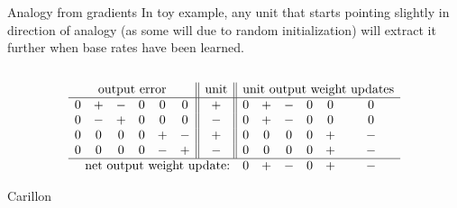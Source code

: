 \documentclass{beamer}
\begin{document}
\begin{frame}[allowframebreaks]


\end{frame}

\appendix
\begin{frame}{Analogy from gradients}
In toy example, any unit that starts pointing slightly in direction of analogy (as some will due to random initialization) will extract it further when base rates have been learned.\\[11pt]
\begin{columns}
\end{columns} 
{ 
\[
\begin{array}{cccccc||c||cccccc} 
\multicolumn{6}{c||}{\text{output error}}  & \text{unit}  & \multicolumn{6}{c}{\text{unit output weight updates}} \\
\hline
 0 & + & - & 0 & 0 & 0  &   +    &  0 & + & - & 0 & 0 & 0   \\
0 & - & + & 0 & 0 & 0  &   -  & 0 & + & - & 0 & 0 & 0   \\
 0 & 0 & 0 & 0 & + & - &   +   &  0 & 0 & 0 & 0 & + & - \\
 0 & 0 & 0 & 0 & - & +  &  - &  0 & 0 & 0 & 0 & + & - \\
\hline
\multicolumn{7}{r}{\text{net output weight update:}} &   0 & + & - & 0 & + & - \\
\end{array} 
\]
}
\end{frame}

\begin{frame}{Carillon}
\begin{center}
\end{center}
\end{frame}
\end{document}
